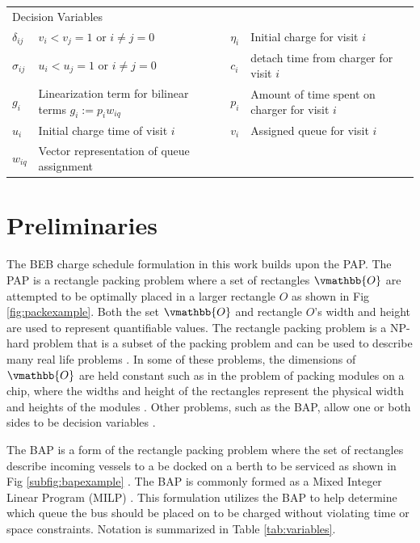 \documentclass[letterpaper, 10pt, conference]{IEEEtran}
\begin{document}
\begin{table}[!t]
\begin{tabular}{l l l l}
		\hline
		\multicolumn{4}{l}{Decision Variables} \\
			$\delta_{ij}$ & $v_i < v_j = 1$ \textrm{ or } $i \neq j = 0$                    &
			$\eta_i$      & Initial charge for visit $i$                                    \\
			$\sigma_{ij}$ & $u_i < u_j = 1$ \textrm{ or } $i \neq j = 0$                    &
			$c_i$         & detach time from charger for visit $i$                          \\
			$g_i$         & Linearization term for bilinear terms $g_i := p_i w_{iq}$       &
			$p_i$         & Amount of time spent on charger for visit $i$                   \\
			$u_i$         & Initial charge time of visit $i$                                &
			$v_i$         & Assigned queue for visit $i$                                    \\
			$w_{iq}$      & Vector representation of queue assignment                       \\
			\bottomrule
	\end{tabular}
\end{table}

\section{Preliminaries}
\label{sec:preliminaries}
The BEB charge schedule formulation in this work builds upon the PAP. The PAP is a rectangle packing problem where a set of rectangles \(\vmathbb{O}\) are attempted to be optimally placed in a larger rectangle \(O\) as shown in Fig \ref{fig:packexample}. Both the set \(\vmathbb{O}\) and rectangle \(O\)'s width and height are used to represent quantifiable values. The rectangle packing problem is a NP-hard problem that is a subset of the packing problem and can be used to describe many real life problems \cite{Bruin2013,Murata1995}. In some of these problems, the dimensions of \(\vmathbb{O}\) are held constant such as in the problem of packing modules on a chip, where the widths and height of the rectangles represent the physical width and heights of the modules \cite{Murata1995}. Other problems, such as the BAP, allow one or both sides to be decision variables \cite{Buhrkal2010}.

The BAP is a form of the rectangle packing problem where the set of rectangles describe incoming vessels to a be docked on a berth to be serviced as shown in Fig \ref{subfig:bapexample} \cite{Dai2008}. The BAP is commonly formed as a Mixed Integer Linear Program (MILP) \cite{Frojan2015,Buhrkal2010}. This formulation utilizes the BAP to help determine which queue the bus should be placed on to be charged without violating time or space constraints. Notation is summarized in Table \ref{tab:variables}.
\end{document}
